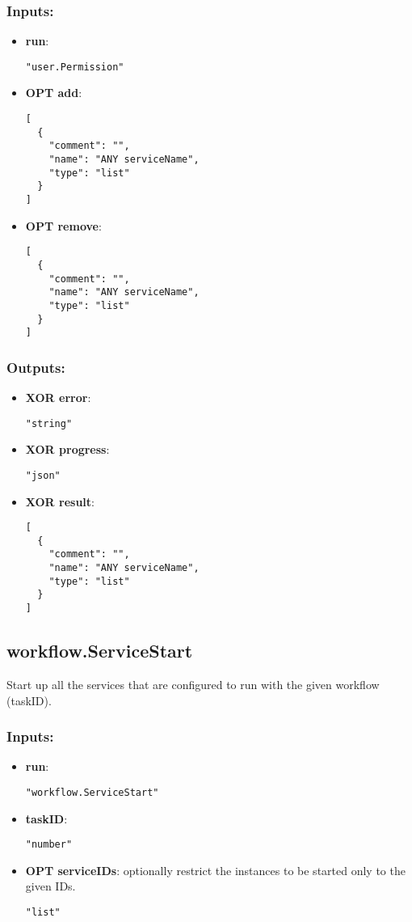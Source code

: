 \subsubsection*{Inputs:}
\begin{itemize}
    \item \textbf{run}: 
\begin{lstlisting}
"user.Permission"
\end{lstlisting}
    \item \textbf{OPT add}: 
\begin{lstlisting}
[
  {
    "comment": "", 
    "name": "ANY serviceName", 
    "type": "list"
  }
]
\end{lstlisting}
    \item \textbf{OPT remove}: 
\begin{lstlisting}
[
  {
    "comment": "", 
    "name": "ANY serviceName", 
    "type": "list"
  }
]
\end{lstlisting}
  \end{itemize}

\subsubsection*{Outputs:}
\begin{itemize}
    \item \textbf{XOR error}: 
\begin{lstlisting}
"string"
\end{lstlisting}
    \item \textbf{XOR progress}: 
\begin{lstlisting}
"json"
\end{lstlisting}
    \item \textbf{XOR result}: 
\begin{lstlisting}
[
  {
    "comment": "", 
    "name": "ANY serviceName", 
    "type": "list"
  }
]
\end{lstlisting}
  \end{itemize}

\subsection{workflow.ServiceStart}
Start up all the services that are configured to run with the given workflow (taskID).
\subsubsection*{Inputs:}
\begin{itemize}
    \item \textbf{run}: 
\begin{lstlisting}
"workflow.ServiceStart"
\end{lstlisting}
    \item \textbf{taskID}: 
\begin{lstlisting}
"number"
\end{lstlisting}
    \item \textbf{OPT serviceIDs}: optionally restrict the instances to be started only to the given IDs.
\begin{lstlisting}
"list"
\end{lstlisting}
  \end{itemize}

